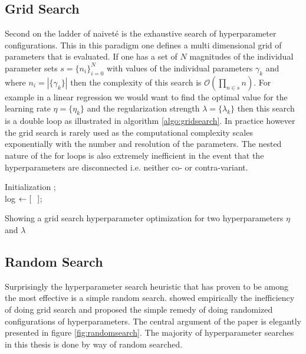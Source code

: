 \subsection{Grid Search}
Second on the ladder of naiveté is the exhaustive search of hyperparameter configurations. This in this paradigm one defines a multi dimensional grid of parameters that is evaluated. If one has a set of $N$ magnitudes of the individual parameter sets $s = \{n_i\}_{i=0}^{N}$ with values of the individual parameters $\gamma_k$ and where $n_i = |\{\gamma_k\}|$ then the complexity of this search is $\mathcal{O}(\prod_{n \in s} n)$. For example in a linear regression we would want to find the optimal value for the learning rate $\eta = \{\eta_k\}$ and the regularization strength $\lambda = \{\lambda_k\}$ then this search is a double loop as illustrated in algorithm \ref{algo:gridsearch}. In practice however the grid search is rarely used as the computational complexity scales exponentially with the number and resolution of the parameters. The nested nature of the for loops is also extremely inefficient in the event that the hyperparameters are disconnected i.e. neither co- or contra-variant.  

\begin{algorithm}[H]
\SetAlgoLined
{}
Initialization ;\\
log $\leftarrow [\hspace{0.1in}]$;\\
\caption{Showing a grid search hyperparameter optimization for two hyperparameters $\eta$ and $\lambda$}\label{algo:gridsearch}
\end{algorithm}


\subsection{Random Search}
Surprisingly the hyperparameter search heuristic that has proven to be among the most effective is a simple random search. \citet{Bergstra2012} showed empirically the inefficiency of doing grid search and proposed the simple remedy of doing randomized configurations of hyperparameters. The central argument of the paper is elegantly presented in figure \ref{fig:randomsearch}. The majority of hyperparameter searches in this thesis is done by way of random searched. 

